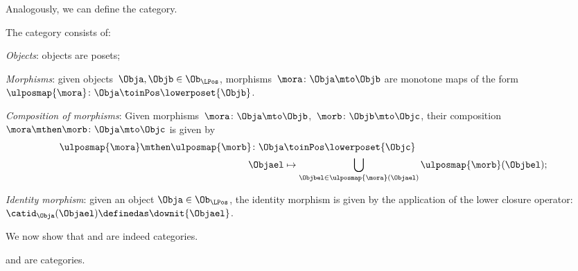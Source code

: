 Analogously, we can define the \LPos category.
\begin{definition}
\label{def:lpos_cat}
The category \LPos consists of:
\begin{compactenum}
    \item \emph{Objects}: objects are posets;
    \item \emph{Morphisms}: given objects~$\Obja,\Objb\in \Ob_{\LPos}$, morphisms~$\mora\colon \Obja\mto \Objb$ are monotone maps of the form~$\ulposmap{\mora} \colon \Obja \toinPos \lowerposet{\Objb}$.
    \item \emph{Composition of morphisms}: Given morphisms~$\mora \colon \Obja \mto \Objb$,~$\morb \colon \Objb\mto \Objc$, their composition~$\mora\mthen \morb\colon \Obja\mto \Objc$ is given by
    \begin{equation}
    \begin{aligned}
        \ulposmap{\mora} \mthen \ulposmap{\morb} \colon \Obja &\toinPos \lowerposet{\Objc}\\
        \Objael&\mapsto \bigcup_{\Objbel\in \ulposmap{\mora} (\Objael)}\ulposmap{\morb}(\Objbel);
    \end{aligned}
    \end{equation}
    \item \emph{Identity morphism}: given an object $\Obja\in \Ob_{\LPos}$, the identity morphism is given by the application of the lower closure operator:~$\catid_\Obja(\Objael)\definedas \downit\{\Objael\}$.
\end{compactenum}
\end{definition}

We now show that \UPos and \LPos are indeed categories.

\begin{lemma}
\label{lem:upos_lpos_cats}
\UPos and \LPos are categories.
\end{lemma}

